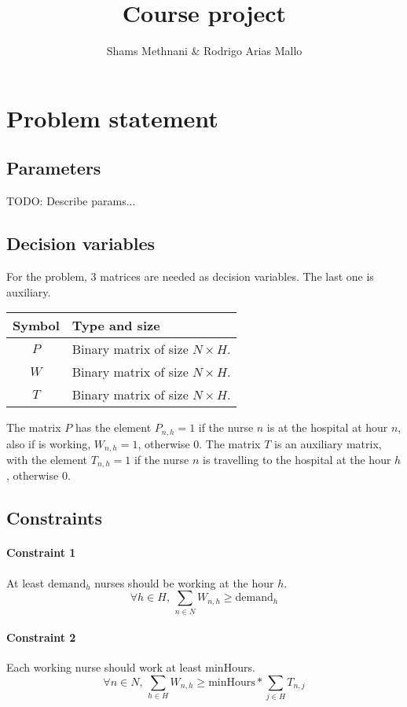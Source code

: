 \documentclass[12pt,a4paper]{article}
\title{Course project}
\author{Shams Methnani \& Rodrigo Arias Mallo}
\begin{document}
\maketitle

\section{Problem statement}

\subsection{Parameters}

TODO: Describe params...

\subsection{Decision variables}

For the problem, 3 matrices are needed as decision variables. The last one is
auxiliary.
%
\begin{table}[h]
\centering
\begin{tabular}{c l}
\toprule
Symbol & Type and size \\
\midrule
$P$ & Binary matrix of size $N \times H$.\\
$W$ & Binary matrix of size $N \times H$.\\
$T$ & Binary matrix of size $N \times H$.\\
\bottomrule
\end{tabular}
\end{table}

\noindent
The matrix $P$ has the element $P_{n,h} = 1$ if the nurse $n$ is at the hospital
at hour $n$, also if is working, $W_{n,h} = 1$, otherwise 0.
%
The matrix $T$ is an auxiliary matrix, with the element $T_{n,h} = 1$ if the
nurse $n$ is travelling to the hospital at the hour $h$, otherwise 0.

\subsection{Constraints}

\paragraph{Constraint 1} At least $\textrm{demand}_h$ nurses should be working
at the hour $h$.
$$ \forall h\in H,\, \sum_{n \in N} W_{n,h} \ge \textrm{demand}_h$$
%
\paragraph{Constraint 2} Each working nurse should work at least minHours.
$$ \forall n \in N,\, \sum_{h \in H} W_{n,h} \ge
	\textrm{minHours} * \sum_{j \in H} T_{n,j} $$
%
\end{document}
